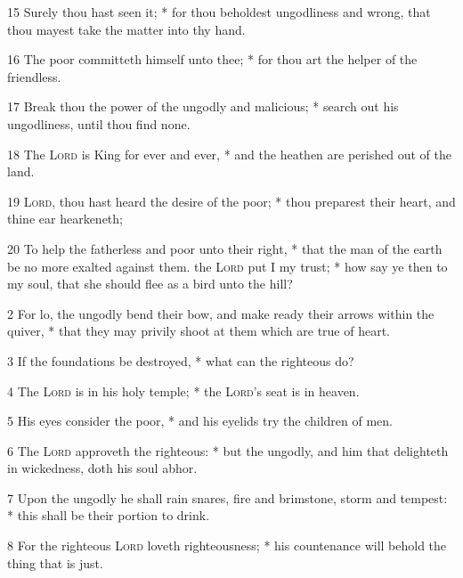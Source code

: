 15 Surely thou hast seen it; * for thou beholdest ungodliness and wrong, that thou mayest take the matter into thy hand.\par
16 The poor committeth himself unto thee; * for thou art the helper of the friendless.\par
17 Break thou the power of the ungodly and malicious; * search out his ungodliness, until thou find none.\par
18 The {\textsc{Lord}} is King for ever and ever, * and the heathen are perished out of the land.\par
19 {\textsc{Lord}}, thou hast heard the desire of the poor; * thou preparest their heart, and thine ear hearkeneth;\par
20 To help the fatherless and poor unto their right, * that the man of the earth be no more exalted against them.
 the {\textsc{Lord}} put I my trust; * how say ye then to my soul, that she should flee as a bird unto the hill?\par
2 For lo, the ungodly bend their bow, and make ready their arrows within the quiver, * that they may privily shoot at them which are true of heart.\par
3 If the foundations be destroyed, * what can the righteous do?\par
4 The {\textsc{Lord}} is in his holy temple; * the {\textsc{Lord}}'s seat is in heaven.\par
5 His eyes consider the poor, * and his eyelids try the children of men.\par
6 The {\textsc{Lord}} approveth the righteous: * but the ungodly, and him that delighteth in wickedness, doth his soul abhor.\par
7 Upon the ungodly he shall rain snares, fire and brimstone, storm and tempest: * this shall be their portion to drink.\par
8 For the righteous {\textsc{Lord}} loveth righteousness; * his countenance will behold the thing that is just.
